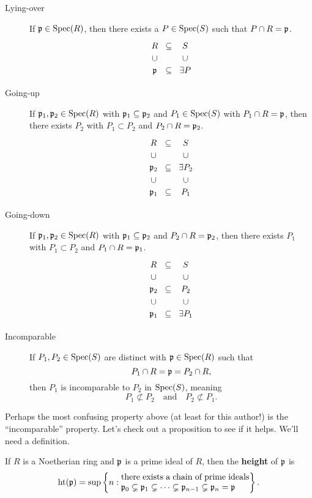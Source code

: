 \documentclass{ximera}
\begin{document}
\begin{description}
\item[Lying-over] If $\mathfrak{p}\in\operatorname{Spec}(R)$, then there exists a
  $P\in\operatorname{Spec}(S)$ such that $P\cap R = \mathfrak{p}$.
  \[
  \begin{tikzcd}[row sep=0em,column sep=0em]
    R    & \subset & S \\
    \cup &         & \cup \\
    \p   & \subset & \exists P
  \end{tikzcd}
  \]
\item[Going-up] If $\mathfrak{p}_1,\mathfrak{p}_2\in\operatorname{Spec}(R)$ with $\mathfrak{p}_1\subseteq\mathfrak{p}_2$ and
  $P_1\in\operatorname{Spec}(S)$ with $P_1\cap R= \mathfrak{p}$, then there exists $P_2$ with
  $P_1\subset P_2$ and $P_2\cap R = \mathfrak{p}_2$.
  \[
  \begin{tikzcd}[row sep=0em,column sep=0em]
    R    & \subset & S \\
    \cup &         & \cup \\
    \p_2 & \subset & \exists P_2 \\
    \cup &         & \cup \\
    \p_1 & \subset & P_1  
  \end{tikzcd}
  \]
\item[Going-down] If $\mathfrak{p}_1,\mathfrak{p}_2\in\operatorname{Spec}(R)$ with $\mathfrak{p}_1\subseteq\mathfrak{p}_2$ and
  $P_2\cap R = \mathfrak{p}_2$, then there exists $P_1$ with $P_1\subset P_2$
  and $P_1\cap R = \mathfrak{p}_1$.
  \[
  \begin{tikzcd}[row sep=0em,column sep=0em]
    R    & \subset & S \\
    \cup &         & \cup \\
    \p_2 & \subset & P_2 \\
    \cup &         & \cup \\
    \p_1 & \subset & \exists P_1  
  \end{tikzcd}
  \]
\item[Incomparable] If $P_1,P_2\in\operatorname{Spec}(S)$ are
  distinct with $\mathfrak{p}\in\operatorname{Spec}(R)$ such that
  \[
  P_1\cap R= \mathfrak{p}= P_2\cap R,
  \]
  then $P_1$ is incomparable to $P_2$ in $\operatorname{Spec}(S)$, meaning
  \[
  P_1\not\subset P_2\quad\text{and}\quad P_2\not\subset P_1.
  \]
\end{description}

Perhaps the most confusing property above (at least for this author!)
is the ``incomparable'' property. Let's check out a proposition to see
if it helps. We'll need a definition.

\begin{definition}
  If $R$ is a Noetherian ring and $\mathfrak{p}$ is a prime ideal of $R$, then the \textbf{height} of $\mathfrak{p}$ is 
  \[
  \h(\p) = \sup\left\{n : \begin{minipage}{15em}there exists a chain of prime ideals $\p_0\subsetneq \p_1 \subsetneq \cdots \subsetneq \p_{n-1}\subsetneq \p_n =\p$\end{minipage} \right\}.
  \]
\end{definition}
\end{document}
